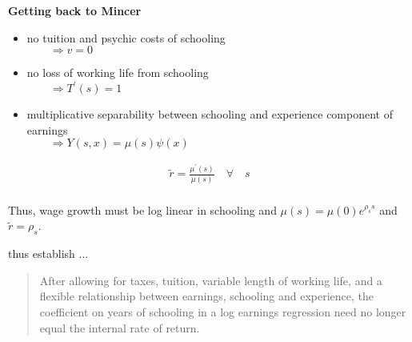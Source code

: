 \begin{frame}\textbf{Getting back to Mincer}\vspace{0.3cm}
\begin{itemize}\setlength\itemsep{1em}
\item no tuition and psychic costs of schooling \\
    $\qquad\Rightarrow v = 0$
\item no loss of working life from schooling \\
    $\qquad\Rightarrow T^\prime(s) = 1$
\item multiplicative separability between schooling and experience component of earnings \\
    $\qquad\Rightarrow Y(s, x) = \mu(s)\psi(x)$
\end{itemize}
\end{frame}
\begin{frame}
\begin{align*}
\tilde{r} = \frac{\mu^\prime(s)}{\mu(s)}\quad\forall\quad s\\
\end{align*}

Thus, wage growth must be log linear in schooling and $\mu(s) = \mu(0)e^{\rho_s s}$ and $\tilde{r} = \rho_s$.

\end{frame}
\begin{frame}
 thus establish ... \vspace{0.5cm}

\begin{quote}
After allowing for taxes, tuition, variable length of working life, and a flexible relationship between earnings, schooling and experience, the coefficient on years of schooling in a log earnings regression need no longer equal the internal rate of return.
\end{quote}
\end{frame}
